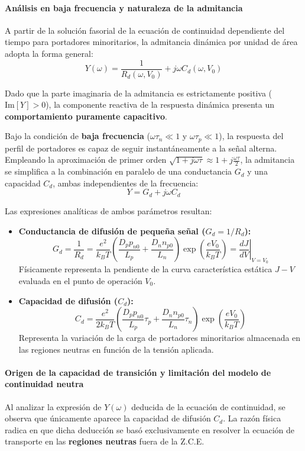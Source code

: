 \newpage
\paragraph{Análisis en baja frecuencia y naturaleza de la admitancia}
A partir de la solución fasorial de la ecuación de continuidad dependiente del tiempo para portadores minoritarios, la admitancia dinámica por unidad de área adopta la forma general:
\[
Y(\omega) = \frac{1}{R_d(\omega, V_0)} + j \omega C_d(\omega, V_0)
\]

Dado que la parte imaginaria de la admitancia es estrictamente positiva ($\text{Im}[Y] > 0$), la componente reactiva de la respuesta dinámica presenta un \textbf{comportamiento puramente capacitivo}.

Bajo la condición de \textbf{baja frecuencia} ($\omega \tau_n \ll 1$ y $\omega \tau_p \ll 1$), la respuesta del perfil de portadores es capaz de seguir instantáneamente a la señal alterna. Empleando la aproximación de primer orden $\sqrt{1 + j\omega \tau} \approx 1 + j \frac{\omega \tau}{2}$, la admitancia se simplifica a la combinación en paralelo de una conductancia $G_d$ y una capacidad $C_d$, ambas independientes de la frecuencia:
\[
Y = G_d + j \omega C_d
\]

Las expresiones analíticas de ambos parámetros resultan:
\begin{itemize}
    \item \textbf{Conductancia de difusión de pequeña señal ($G_d = 1/R_d$):}
    \[
    G_d = \frac{1}{R_d} = \frac{e^2}{k_B T} \left( \frac{D_p p_{n0}}{L_p} + \frac{D_n n_{p0}}{L_n} \right) \exp\left(\frac{e V_0}{k_B T}\right) = \left. \frac{dJ}{dV} \right|_{V=V_0}
    \]
    Físicamente representa la pendiente de la curva característica estática $J-V$ evaluada en el punto de operación $V_0$.

    \item \textbf{Capacidad de difusión ($C_d$):}
    \[
    C_d = \frac{e^2}{2 k_B T} \left( \frac{D_p p_{n0}}{L_p} \tau_p + \frac{D_n n_{p0}}{L_n} \tau_n \right) \exp\left(\frac{e V_0}{k_B T}\right)
    \]
    Representa la variación de la carga de portadores minoritarios almacenada en las regiones neutras en función de la tensión aplicada.
\end{itemize}

\newpage
\paragraph{Origen de la capacidad de transición y limitación del modelo de continuidad neutra}
Al analizar la expresión de $Y(\omega)$ deducida de la ecuación de continuidad, se observa que únicamente aparece la capacidad de difusión $C_d$. La razón física radica en que dicha deducción se basó exclusivamente en resolver la ecuación de transporte en las \textbf{regiones neutras} fuera de la Z.C.E.


